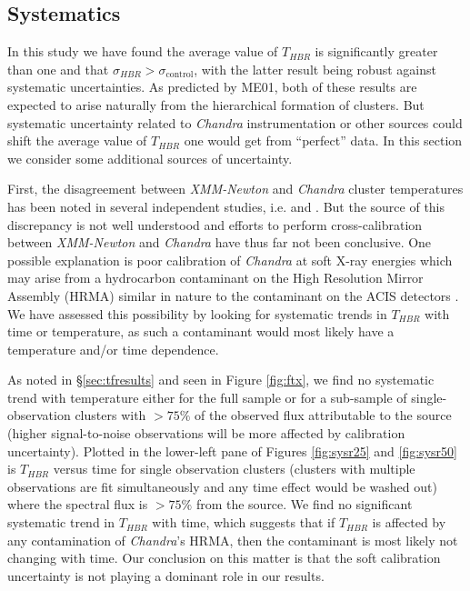 \documentclass[12pt,preprint]{aastex}
\begin{document}
\subsection{Systematics} \label{sec:sys}

In this study we have found the average value of $T_{HBR}$ is significantly
greater than one and that $\sigma_{HBR} > \sigma_{\mathrm{control}}$, with the
latter result being robust against systematic uncertainties. As
predicted by ME01, both of these results are expected to arise
naturally from the hierarchical formation of clusters. But systematic
uncertainty related to {\it Chandra} instrumentation or other sources could
shift the average value of $T_{HBR}$ one would get from ``perfect'' data. In
this section we consider some additional sources of uncertainty.

First, the disagreement between {\it XMM-Newton} and {\it Chandra}
cluster temperatures has been noted in several independent studies,
i.e. \cite{2005ApJ...628..655V} and \cite{chanxmmdis}. But the source of this
discrepancy is not well understood and efforts to perform
cross-calibration between {\it XMM-Newton} and {\it Chandra} have thus
far not been conclusive. One possible explanation is poor calibration
of {\it Chandra} at soft X-ray energies which may arise from a
hydrocarbon contaminant on the High Resolution Mirror Assembly (HRMA)
similar in nature to the contaminant on the ACIS detectors
\citep{aciscontaminant}. We have assessed this possibility by looking
for systematic trends in $T_{HBR}$ with time or temperature, as such a
contaminant would most likely have a temperature and/or time
dependence.

As noted in \S\ref{sec:tfresults} and seen in Figure \ref{fig:ftx}, we
find no systematic trend with temperature either for the full sample
or for a sub-sample of single-observation clusters with $> 75\%$ of
the observed flux attributable to the source (higher signal-to-noise
observations will be more affected by calibration
uncertainty). Plotted in the lower-left pane of Figures
\ref{fig:sysr25} and \ref{fig:sysr50} is $T_{HBR}$ versus time for
single observation clusters (clusters with multiple observations are
fit simultaneously and any time effect would be washed out) where
the spectral flux is $> 75\%$ from the source. We find no significant
systematic trend in $T_{HBR}$ with time, which suggests that if
$T_{HBR}$ is affected by any contamination of {\it Chandra}'s HRMA,
then the contaminant is most likely not changing with time. Our
conclusion on this matter is that the soft calibration uncertainty is
not playing a dominant role in our results.
\end{document}
